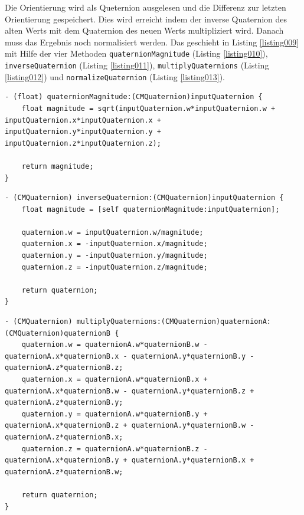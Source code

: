 Die Orientierung wird als Queternion ausgelesen und die Differenz zur letzten Orientierung gespeichert. Dies wird erreicht indem der inverse Quaternion des alten Werts mit dem Quaternion des neuen Werts multipliziert wird. Danach muss das Ergebnis noch normalisiert werden. Das geschieht in Listing \ref{listing009} mit Hilfe der vier Methoden \texttt{quaternionMagnitude} (Listing \ref{listing010}), \texttt{inverseQuaternion} (Listing \ref{listing011}), \texttt{multiplyQuaternions} (Listing \ref{listing012}) und \texttt{normalizeQuaternion} (Listing \ref{listing013}).
~\\
\begin{lstlisting}[float=htb, caption=Methode \texttt{quaternionMagnitude}, label=listing010]
- (float) quaternionMagnitude:(CMQuaternion)inputQuaternion {
	float magnitude = sqrt(inputQuaternion.w*inputQuaternion.w + inputQuaternion.x*inputQuaternion.x + inputQuaternion.y*inputQuaternion.y + inputQuaternion.z*inputQuaternion.z);
	
	return magnitude;
}
\end{lstlisting}


\begin{lstlisting}[float=htb, caption=Methode \texttt{inverseQuaternion}, label=listing011]
- (CMQuaternion) inverseQuaternion:(CMQuaternion)inputQuaternion {
	float magnitude = [self quaternionMagnitude:inputQuaternion];
	
	quaternion.w = inputQuaternion.w/magnitude;
	quaternion.x = -inputQuaternion.x/magnitude;
	quaternion.y = -inputQuaternion.y/magnitude;
	quaternion.z = -inputQuaternion.z/magnitude;
	
	return quaternion;
}
\end{lstlisting}

\begin{lstlisting}[float=htb, caption=Methode \texttt{multiplyQuaternions}, label=listing012]
- (CMQuaternion) multiplyQuaternions:(CMQuaternion)quaternionA:(CMQuaternion)quaternionB {
	quaternion.w = quaternionA.w*quaternionB.w - quaternionA.x*quaternionB.x - quaternionA.y*quaternionB.y - quaternionA.z*quaternionB.z;
	quaternion.x = quaternionA.w*quaternionB.x + quaternionA.x*quaternionB.w - quaternionA.y*quaternionB.z + quaternionA.z*quaternionB.y;
	quaternion.y = quaternionA.w*quaternionB.y + quaternionA.x*quaternionB.z + quaternionA.y*quaternionB.w - quaternionA.z*quaternionB.x;
	quaternion.z = quaternionA.w*quaternionB.z - quaternionA.x*quaternionB.y + quaternionA.y*quaternionB.x + quaternionA.z*quaternionB.w;

	return quaternion;
}
\end{lstlisting}

